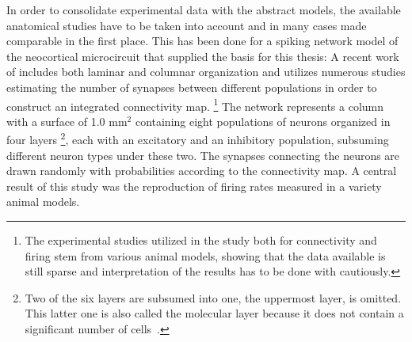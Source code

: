 In order to consolidate experimental data with the abstract models,
the available anatomical studies have to be taken into account and 
in many cases made comparable in the first place.
This has been done for a spiking network model of the neocortical microcircuit
that supplied the basis for this thesis:
A recent work of  
includes both laminar and columnar organization and utilizes numerous studies 
estimating the number of synapses between different populations in order to construct an
integrated connectivity map.%
\footnote{ 
The experimental studies utilized in the study both for connectivity and firing 
stem from various animal models, showing that the data available is still sparse
and interpretation of the results has to be done with cautiously.
}
The network represents a column with a
surface of 1.0 $\text{mm}^2$ containing eight populations of neurons organized in four layers%
\footnote{
    Two of the six layers are subsumed into one, the uppermost layer, is omitted.
    This latter one is also called the molecular layer because it does not contain a significant number of 
cells~\cite{bear2007neuroscience}.
}, each with an excitatory and an inhibitory population, subsuming different neuron
types under these two. 
The synapses connecting the neurons are drawn randomly with probabilities according to 
the connectivity map. A central result of this study was the reproduction of 
firing rates measured in a variety animal models. 

